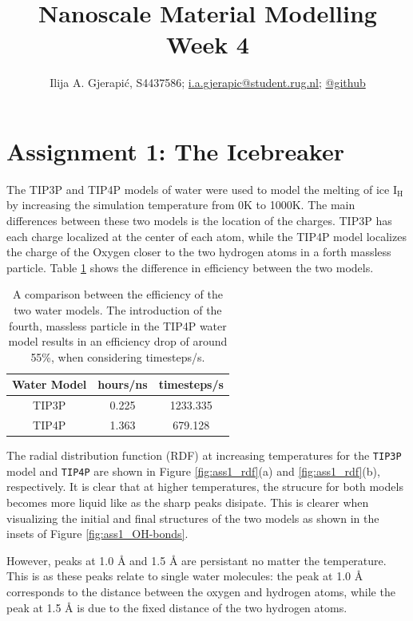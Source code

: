 \documentclass[10pt,a4paper]{labreport}
\title{Nanoscale Material Modelling
\\
\normalsize{Week 4}} %
\author{Ilija A. Gjerapić, S4437586; \href{mailto:i.a.gjerapic@student.rug.nl}{i.a.gjerapic@student.rug.nl}; \href{https://github.com/igjerapic/nmm-week4/}{@github} } %
\begin{document}
\maketitle
\tableofcontents


  

\thispagestyle{firststyle}
\newpage
\section{Assignment 1: The Icebreaker}
The TIP3P and TIP4P models of water were used to model the melting of ice I$_\text{H}$ by increasing the simulation temperature from 0K to 1000K. 
The main differences between these two models is the location of the charges. 
TIP3P has each charge localized at the center of each atom, while the TIP4P model localizes the charge of the Oxygen closer to the two hydrogen atoms in a forth massless particle. 
Table \ref{tab:ass1_lammps-bonds} shows the difference in efficiency between the two models.

\begin{table}[h]
    \caption{A comparison between the efficiency of the two water models. The introduction of the fourth, massless particle in the TIP4P water model results in an efficiency drop of around 55\%, when considering timesteps/s. }
    \label{tab:ass1_lammps-bonds}
    \centering
    \begin{tabular}{ccc}
      \hline
    \textbf{Water Model}      & \textbf{hours/ns}     & \textbf{timesteps/s}   \\
    \hline
    TIP3P & 0.225 & 1233.335 \\
    TIP4P & 1.363      & 679.128  \\ \hline
    \end{tabular}
\end{table}

The radial distribution function  (RDF) at increasing temperatures for the \texttt{TIP3P} model and \texttt{TIP4P} are shown in Figure \ref{fig:ass1_rdf}(a) and \ref{fig:ass1_rdf}(b), respectively. It is clear that at higher temperatures, the strucure for both models becomes more liquid like as the sharp peaks disipate. This is clearer when visualizing the initial and final structures of the two models as shown in the insets of Figure \ref{fig:ass1_OH-bonds}.

However, peaks at 1.0 {\AA} and 1.5 {\AA} are persistant no matter the temperature. This is as these peaks relate to single water molecules: the peak at 1.0 {\AA} corresponds to the distance between the oxygen and hydrogen atoms, while the peak at 1.5 {\AA} is due to the fixed distance of the two hydrogen atoms.
  
\end{document}
